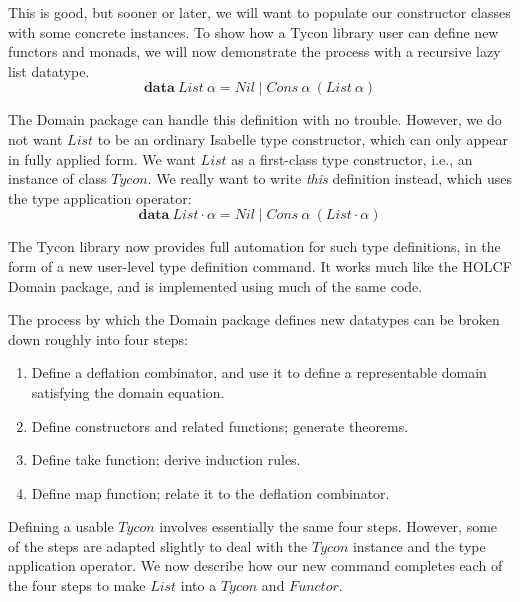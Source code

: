 \documentclass{sigplanconf}
\newcommand{\kwd}[1]{\mathbf{#1}}
\newcommand{\hsc}[1]{\ensuremath{\mathit{#1}}}
\newcommand{\tA}{\alpha}
\theoremstyle{definition}
\begin{document}
This is good, but sooner or later, we will want to populate our constructor classes with some concrete instances. To show how a Tycon library user can define new functors and monads, we will now demonstrate the process with a recursive lazy list datatype.
%
\begin{equation*}
\kwd{data}\:\hsc{List}\:\tA = \hsc{Nil} \mid \hsc{Cons}\:\tA\:(\hsc{List}\:\tA)
\end{equation*}

The Domain package can handle this definition with no trouble. However, we do not want \hsc{List} to be an ordinary Isabelle type constructor, which can only appear in fully applied form. We want \hsc{List} as a first-class type constructor, i.e., an instance of class \hsc{Tycon}. We really want to write \emph{this} definition instead, which uses the type application operator:
%
\begin{equation*}
\kwd{data}\:\hsc{List}\cdot\tA = \hsc{Nil} \mid \hsc{Cons}\:\tA\:(\hsc{List}\cdot\tA)
\end{equation*}

The Tycon library now provides full automation for such type definitions, in the form of a new user-level type definition command. It works much like the HOLCF Domain package, and is implemented using much of the same code.

The process by which the Domain package defines new datatypes can be broken down roughly into four steps:
%
\begin{enumerate}
\item Define a deflation combinator, and use it to define a representable domain satisfying the domain equation.
\item Define constructors and related functions; generate theorems.
\item Define take function; derive induction rules.
\item Define map function; relate it to the deflation combinator.
\end{enumerate}
%
Defining a usable \hsc{Tycon} involves essentially the same four steps. However, some of the steps are adapted slightly to deal with the \hsc{Tycon} instance and the type application operator. We now describe how our new command completes each of the four steps to make \hsc{List} into a \hsc{Tycon} and \hsc{Functor}.
\end{document}
